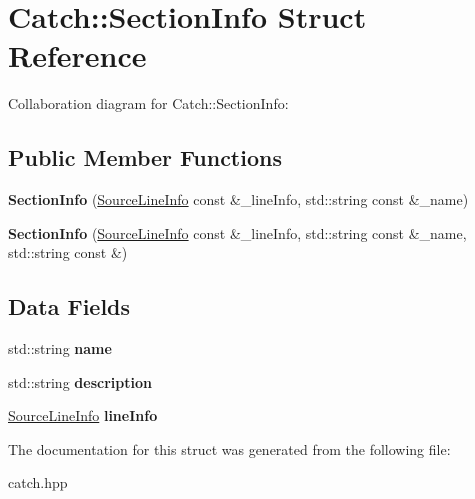 \hypertarget{structCatch_1_1SectionInfo}{}\section{Catch\+:\+:Section\+Info Struct Reference}
\label{structCatch_1_1SectionInfo}


Collaboration diagram for Catch\+:\+:Section\+Info\+:
\subsection*{Public Member Functions}
\begin{DoxyCompactItemize}
\item 
\mbox{\label{structCatch_1_1SectionInfo_a2808437ae7d4bc0830cee1c3995165a6}} 
{\bfseries Section\+Info} (\hyperlink{structCatch_1_1SourceLineInfo}{Source\+Line\+Info} const \&\+\_\+line\+Info, std\+::string const \&\+\_\+name)
\item 
\mbox{\label{structCatch_1_1SectionInfo_a139875f2e7bd12a5898a948f8bad15b3}} 
{\bfseries Section\+Info} (\hyperlink{structCatch_1_1SourceLineInfo}{Source\+Line\+Info} const \&\+\_\+line\+Info, std\+::string const \&\+\_\+name, std\+::string const \&)
\end{DoxyCompactItemize}
\subsection*{Data Fields}
\begin{DoxyCompactItemize}
\item 
\mbox{\label{structCatch_1_1SectionInfo_a704c8fc662d309137e0d4f199cb7df58}} 
std\+::string {\bfseries name}
\item 
\mbox{\label{structCatch_1_1SectionInfo_a0052060219a6de74bb7ade34d4163a4e}} 
std\+::string {\bfseries description}
\item 
\mbox{\label{structCatch_1_1SectionInfo_adbc83b8a3507c4acc8ee249e93465711}} 
\hyperlink{structCatch_1_1SourceLineInfo}{Source\+Line\+Info} {\bfseries line\+Info}
\end{DoxyCompactItemize}


The documentation for this struct was generated from the following file\+:\begin{DoxyCompactItemize}
\item 
catch.\+hpp\end{DoxyCompactItemize}
